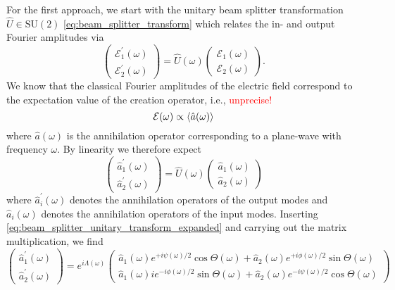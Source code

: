 For the first approach, we start with the unitary beam splitter transformation $\hat{U}\in\text{SU}(2)$ \cref{eq:beam_splitter_transform} which relates the in- and output Fourier amplitudes via
\begin{equation}
	\begin{pmatrix}
		\mathcal{E}_1^\prime(\omega)
		\\
		\mathcal{E}_2^\prime(\omega)
	\end{pmatrix}
	=
	\hat{U}(\omega)
	\begin{pmatrix}
		\mathcal{E}_1(\omega)
		\\
		\mathcal{E}_2(\omega)
	\end{pmatrix}
	.
\end{equation}
We know that the classical Fourier amplitudes of the electric field correspond to the expectation value of the creation operator, i.e., \textcolor{red}{unprecise!}
\begin{equation}
	\mathcal{E}(\omega)
	\propto
	\expval{\hat{a}(\omega)}
\end{equation}
where $\hat{a}(\omega)$ is the annihilation operator corresponding to a plane-wave with frequency $\omega$.
By linearity we therefore expect
\begin{equation}
	\begin{pmatrix}
		\hat{a}_1^\prime(\omega)
		\\
		\hat{a}_2^\prime(\omega)
	\end{pmatrix}
	=
	\hat{U}(\omega)
	\begin{pmatrix}
		\hat{a}_1(\omega)
		\\
		\hat{a}_2(\omega)
	\end{pmatrix}
\end{equation}
where $\hat{a}_i^\prime(\omega)$ denotes the annihilation operators of the output modes and $\hat{a}_i(\omega)$ denotes the annihilation operators of the input modes.
Inserting \cref{eq:beam_splitter_unitary_transform_expanded} and carrying out the matrix multiplication, we find
\begin{equation}
	\begin{pmatrix}
		\hat{a}_1^\prime(\omega)
		\\
		\hat{a}_2^\prime(\omega)
	\end{pmatrix}
	=
	e^{i\Lambda(\omega)}
    \begin{pmatrix}
        \hat{a}_1(\omega)e^{+i\psi(\omega)/2}\cos\Theta(\omega) +\hat{a}_2(\omega)e^{+i\phi(\omega)/2}\sin\Theta(\omega)
        \\
        \hat{a}_1(\omega)ie^{-i\phi(\omega)/2}\sin\Theta(\omega) + \hat{a}_2(\omega)e^{-i\psi(\omega)/2}\cos\Theta(\omega)
    \end{pmatrix}
\end{equation}
